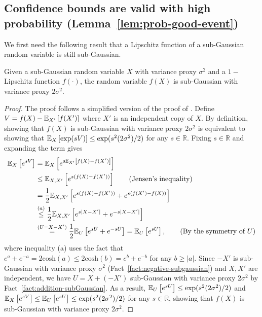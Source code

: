 \subsection{Confidence bounds are valid with high probability (Lemma~\ref{lem:prob-good-event})}\label{app:lem-prob-good-event}
We first need the following result that a Lipschitz function of a sub-Gaussian random variable is still sub-Gaussian. 
\begin{lemma}\label{lem:sub-gaussian}
Given a sub-Gaussian random variable $X$ with variance proxy $\sigma^2$ and a $1-$Lipschitz function $f(\cdot)$, the random variable $f(X)$ is sub-Gaussian with variance proxy $2\sigma^2.$
\end{lemma}
\begin{proof}
The proof follows a simplified version of the proof of \cite[Theorem~1]{kontorovich2014concentration}. Define $V = f(X) - \mathbb E_{X'}\left[f(X')\right]$ where $X'$ is an independent copy of $X$. By definition, showing that $f(X)$ is sub-Gaussian with variance proxy $2\sigma^2$ is equivalent to showing that $\mathbb E_{X}\left[\exp(sV)\right] \leq \exp(s^2(2\sigma^2)/2)$ for any $s \in \mathbb{R}.$ Fixing $s \in \mathbb{R}$ and expanding the term gives
\begin{align*}
\mathbb E_{X}\left[e^{sV}\right] &= \mathbb E_{X}\left[e^{s\mathbb E_{X'}\left[f(X)-f(X')\right]}\right] \\
&\leq \mathbb E_{X,X'}\left[e^{s(f(X)-f(X'))}\right] \tag{Jensen's inequality} \\
&= \frac{1}{2}\mathbb E_{X,X'}\left[e^{s(f(X)-f(X'))} + e^{s(f(X')-f(X))}\right] \\
&\overset{(a)}{\leq} \frac{1}{2}\mathbb E_{X,X'}\left[e^{s|X-X'|} + e^{-s|X-X'|}\right] \\
&\overset{(U=X-X')}{=} \frac{1}{2}\mathbb E_{U}\left[e^{sU} + e^{-sU}\right] = \mathbb E_{U}\left[e^{sU}\right], \tag{By the symmetry of $U$}
\end{align*}
where inequality (a) uses the fact that $e^{a}+e^{-a} = 2\mathrm{cosh}(a) \leq 2\mathrm{cosh}(b) = e^b + e^{-b}$ for any $b \geq |a|.$ Since $-X'$ is sub-Gaussian with variance proxy $\sigma^2$ (Fact~\ref{fact:negative-subgaussian}) and $X,X'$ are independent, we have $U = X+(-X')$ sub-Gaussian with variance proxy $2\sigma^2$ by Fact~\ref{fact:addition-subGaussian}. As a result, $\mathbb E_{U}\left[e^{sU}\right] \leq \exp(s^2(2\sigma^2)/2)$ and $\mathbb E_{X}\left[e^{sV}\right] \leq \mathbb E_{U}\left[e^{sU}\right] \leq \exp(s^2(2\sigma^2)/2)$ for any $s \in \mathbb{R}$, showing that $f(X)$ is sub-Gaussian with variance proxy $2\sigma^2$.
\end{proof}

